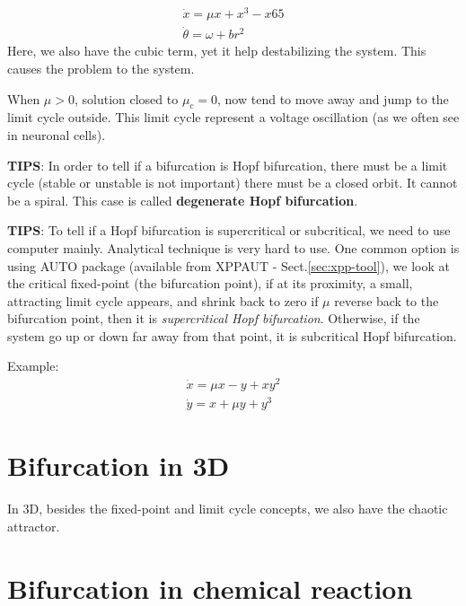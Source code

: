 \begin{equation}
  \label{eq:675}
  \begin{split}
    \dot{x} = \mu x + x^3 - x65 \\
    \dot{\theta} = \omega + br^2
  \end{split}
\end{equation}
Here, we also have the cubic term, yet it help destabilizing the
system. This causes the problem to the system. 

When $\mu>0$, solution closed to $\mu_c=0$, now tend to move away and
jump to the limit cycle outside. This limit cycle represent a voltage
oscillation (as we often see in neuronal cells).


{\bf TIPS}: In order to tell if a bifurcation is Hopf bifurcation,
there must be a limit cycle (stable or unstable is not important)
there must be a closed orbit. It cannot be a spiral. This case is
called {\bf degenerate Hopf bifurcation}. 

{\bf TIPS}: To tell if a Hopf bifurcation is supercritical or subcritical, we
need to use computer mainly. Analytical technique is very hard to use. One
common option is using AUTO package (available from XPPAUT -
Sect.\ref{sec:xpp-tool}), we look at the critical fixed-point (the bifurcation
point), if at its proximity, a small, attracting limit cycle appears, and shrink
back to zero if $\mu$ reverse back to the bifurcation point, then it is {\it
  supercritical Hopf bifurcation}. Otherwise, if the system go up or
down far away from that point, it is subcritical Hopf bifurcation.

Example:
\begin{equation}
  \label{eq:677}
  \begin{split}
    \dot{x}  = \mu x - y + xy^2 \\
    \dot{y} = x + \mu y + y^3
  \end{split}
\end{equation}


\section{Bifurcation in 3D}
\label{sec:bifurcation-3d}

In 3D, besides the fixed-point and limit cycle concepts, we also have
the chaotic attractor.

\section{Bifurcation in chemical reaction}
\label{sec:bifurc-chem-react}

